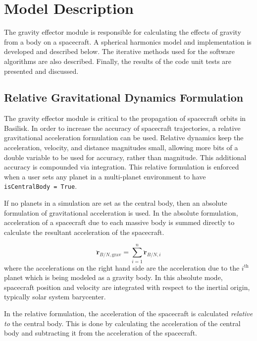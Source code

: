 \section{Model Description}

The gravity effector module is responsible for calculating the effects of gravity from a body on a spacecraft. A spherical harmonics model and implementation is developed and described below. The iterative methods used for the software algorithms are also described. Finally, the results of the code unit tests are presented and discussed.

\subsection{Relative Gravitational Dynamics Formulation}

The gravity effector module is critical to the propagation of spacecraft orbits in Basilisk. In order to increase the accuracy of spacecraft trajectories, a relative gravitational acceleration formulation can be used. Relative dynamics keep the acceleration, velocity, and distance magnitudes small, allowing more bits of a double variable to be used for accuracy, rather than magnitude. This additional accuracy is compounded via integration. This relative formulation is enforced when a user sets any planet in a multi-planet environment to have \verb|isCentralBody = True|.

If no planets in a simulation are set as the central body, then an absolute formulation of gravitational acceleration is used. In the absolute formulation, acceleration of a spacecraft due to each massive body is summed directly to calculate the resultant acceleration of the spacecraft.

\begin{equation}
	\ddot{\bm{r}}_{B/N, \mathrm{grav}} = \sum_{i = 1}^{n} \ddot{\bm{r}}_{B/N, i}
\end{equation}
where the accelerations on the right hand side are the acceleration due to the $i^{\mathrm{th}}$ planet which is being modeled as a gravity body. In this absolute mode, spacecraft position and velocity are integrated with respect to the inertial origin, typically solar system barycenter.

In the relative formulation, the acceleration of the spacecraft is calculated \textit{relative to} the central body. This is done by calculating the acceleration of the central body and subtracting it from the acceleration of the spacecraft.

